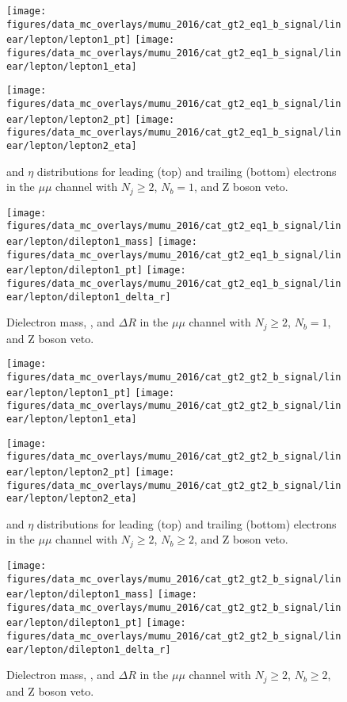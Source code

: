 
\begin{figure}[htb!]
    \centering
    \texttt{[image: figures/data\_mc\_overlays/mumu\_2016/cat\_gt2\_eq1\_b\_signal/linear/lepton/lepton1\_pt]}
    \texttt{[image: figures/data\_mc\_overlays/mumu\_2016/cat\_gt2\_eq1\_b\_signal/linear/lepton/lepton1\_eta]}

    \texttt{[image: figures/data\_mc\_overlays/mumu\_2016/cat\_gt2\_eq1\_b\_signal/linear/lepton/lepton2\_pt]}
    \texttt{[image: figures/data\_mc\_overlays/mumu\_2016/cat\_gt2\_eq1\_b\_signal/linear/lepton/lepton2\_eta]}
    \caption{\pt and $\eta$ distributions for leading (top) and trailing
    (bottom) electrons in the $\mu\mu$ channel with $N_{j} \geq 2$, $N_{b}
    = 1$, and Z boson veto.}
    \label{fig:mumu_1_kinematic}
\end{figure}

\begin{figure}[htb!]
    \centering
    \texttt{[image: figures/data\_mc\_overlays/mumu\_2016/cat\_gt2\_eq1\_b\_signal/linear/lepton/dilepton1\_mass]}
    \texttt{[image: figures/data\_mc\_overlays/mumu\_2016/cat\_gt2\_eq1\_b\_signal/linear/lepton/dilepton1\_pt]}
    \texttt{[image: figures/data\_mc\_overlays/mumu\_2016/cat\_gt2\_eq1\_b\_signal/linear/lepton/dilepton1\_delta\_r]}
    \caption{Dielectron mass, \pt, and $\Delta R$ in the $\mu\mu$ channel
    with $N_{j} \geq 2$, $N_{b} = 1$, and Z boson veto.}
    \label{fig:mumu_1_dilepton}
\end{figure}

\begin{figure}[htb!]
    \centering
    \texttt{[image: figures/data\_mc\_overlays/mumu\_2016/cat\_gt2\_gt2\_b\_signal/linear/lepton/lepton1\_pt]}
    \texttt{[image: figures/data\_mc\_overlays/mumu\_2016/cat\_gt2\_gt2\_b\_signal/linear/lepton/lepton1\_eta]}

    \texttt{[image: figures/data\_mc\_overlays/mumu\_2016/cat\_gt2\_gt2\_b\_signal/linear/lepton/lepton2\_pt]}
    \texttt{[image: figures/data\_mc\_overlays/mumu\_2016/cat\_gt2\_gt2\_b\_signal/linear/lepton/lepton2\_eta]}
    \caption{\pt and $\eta$ distributions for leading (top) and trailing
    (bottom) electrons in the $\mu\mu$ channel with $N_{j} \geq 2$, $N_{b}
    \geq 2$, and Z boson veto.}
    \label{fig:mumu_2_kinematic}
\end{figure}

\begin{figure}[htb!]
    \centering
    \texttt{[image: figures/data\_mc\_overlays/mumu\_2016/cat\_gt2\_gt2\_b\_signal/linear/lepton/dilepton1\_mass]}
    \texttt{[image: figures/data\_mc\_overlays/mumu\_2016/cat\_gt2\_gt2\_b\_signal/linear/lepton/dilepton1\_pt]}
    \texttt{[image: figures/data\_mc\_overlays/mumu\_2016/cat\_gt2\_gt2\_b\_signal/linear/lepton/dilepton1\_delta\_r]}
    \caption{Dielectron mass, \pt, and $\Delta R$ in the $\mu\mu$ channel
    with $N_{j} \geq 2$, $N_{b} \geq 2$, and Z boson veto.}
    \label{fig:mumu_2_dilepton}
\end{figure}

